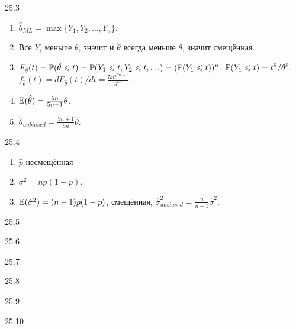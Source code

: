 \begin{solution}{{25.3}}
\begin{enumerate}
\item $\hat\theta_{ML} = \max\{ Y_1, Y_2, \ldots, Y_n\}$.
\item Все $Y_i$ меньше $\theta$, значит и $\hat\theta$ всегда меньше $\theta$, значит смещённая.
\item $F_{\hat\theta}(t) = \P(\hat\theta \leq t) = \P(Y_1 \leq t, Y_2 \leq t, \ldots) = (\P(Y_1 \leq t))^n$, $\P(Y_1 \leq t) = t^5/\theta^5$, $f_{\hat\theta}(t) = dF_{\hat\theta}(t)/dt = \frac{5n t^{5n-1}}{\theta^{5n}}$.
\item $\E(\hat\theta) = \frac{5n}{5n+1}\theta$.
\item $\hat\theta_{unbiased} = \frac{5n+1}{5n}\hat\theta$.
\end{enumerate}
\end{solution}
\protect \hypertarget {soln:25.4}{}
\begin{solution}{{25.4}}
\begin{enumerate}
  \item $\hat p$ несмещённая
  \item $\sigma^2 = n p(1-p)$.
  \item $\E(\hat\sigma^2) = (n-1)p(1-p)$, смещённая, $\hat\sigma^2_{unbiased} = \frac{n}{n-1} \hat\sigma^2$.
\end{enumerate}
\end{solution}
\protect \hypertarget {soln:25.5}{}
\begin{solution}{{25.5}}

\end{solution}
\protect \hypertarget {soln:25.6}{}
\begin{solution}{{25.6}}

\end{solution}
\protect \hypertarget {soln:25.7}{}
\begin{solution}{{25.7}}

\end{solution}
\protect \hypertarget {soln:25.8}{}
\begin{solution}{{25.8}}

\end{solution}
\protect \hypertarget {soln:25.9}{}
\begin{solution}{{25.9}}

\end{solution}
\protect \hypertarget {soln:25.10}{}
\begin{solution}{{25.10}}

\end{solution}
